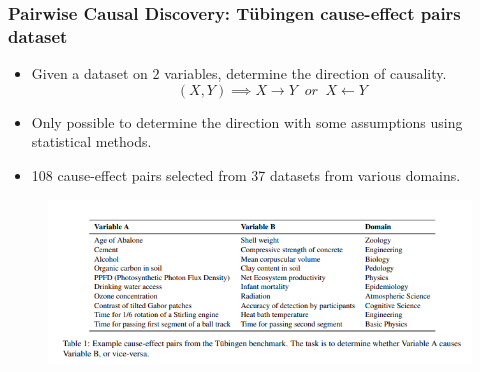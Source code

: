 \documentclass{beamer}
\begin{document}
\begin{frame}
	\frametitle{Pairwise Causal Discovery: T\"{u}bingen cause-effect pairs dataset}
	\begin{itemize}
		\item Given a dataset on $ 2 $ variables, determine the direction of causality.
			$$ (X, Y) \implies X \rightarrow Y \;\; \textit{or} \; \; X \leftarrow Y $$
		\item Only possible to determine the direction with some assumptions using statistical methods.
		\item 108 cause-effect pairs selected from 37 datasets from
			various domains.
	\end{itemize}
	\begin{figure}
		\centering
		\includegraphics[scale=0.5]{imgs/table1.png}
	\end{figure}
\end{frame}
\end{document}
